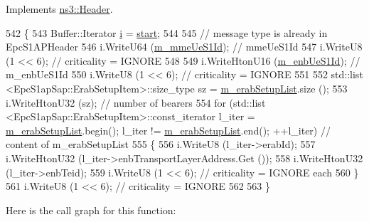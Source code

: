 Implements \hyperlink{classns3_1_1Header_afb61f1aac69ff8349a6bfe521fab5404}{ns3\+::\+Header}.


\begin{DoxyCode}
542 \{
543   Buffer::Iterator \hyperlink{bernuolliDistribution_8m_a6f6ccfcf58b31cb6412107d9d5281426}{i} = \hyperlink{namespacevisualizer_1_1core_a2a35e5d8a34af358b508dac8635754e0}{start};
544 
545   \textcolor{comment}{// message type is already in EpcS1APHeader}
546   i.WriteU64 (\hyperlink{classns3_1_1EpcS1APInitialContextSetupResponseHeader_abe6b8ad648a51caea3869046a89998be}{m\_mmeUeS1Id});         \textcolor{comment}{// mmeUeS1Id}
547   i.WriteU8 (1 << 6);               \textcolor{comment}{// criticality = IGNORE}
548 
549   i.WriteHtonU16 (\hyperlink{classns3_1_1EpcS1APInitialContextSetupResponseHeader_a25eeb666c4dcacb8233d935752d5d359}{m\_enbUeS1Id});     \textcolor{comment}{// m\_enbUeS1Id}
550   i.WriteU8 (1 << 6);               \textcolor{comment}{// criticality = IGNORE}
551 
552   std::list <EpcS1apSap::ErabSetupItem>::size\_type sz = \hyperlink{classns3_1_1EpcS1APInitialContextSetupResponseHeader_a92b6da6866cb4379178a9542e788d787}{m\_erabSetupList}.size (); 
553   i.WriteHtonU32 (sz);              \textcolor{comment}{// number of bearers}
554   \textcolor{keywordflow}{for} (std::list <EpcS1apSap::ErabSetupItem>::const\_iterator l\_iter = 
      \hyperlink{classns3_1_1EpcS1APInitialContextSetupResponseHeader_a92b6da6866cb4379178a9542e788d787}{m\_erabSetupList}.begin(); l\_iter != \hyperlink{classns3_1_1EpcS1APInitialContextSetupResponseHeader_a92b6da6866cb4379178a9542e788d787}{m\_erabSetupList}.end(); ++l\_iter) \textcolor{comment}{//
       content of m\_erabSetupList}
555   \{
556     i.WriteU8 (l\_iter->erabId);
557     i.WriteHtonU32 (l\_iter->enbTransportLayerAddress.Get ());
558     i.WriteHtonU32 (l\_iter->enbTeid);
559     i.WriteU8 (1 << 6);               \textcolor{comment}{// criticality = IGNORE each}
560   \}
561   i.WriteU8 (1 << 6);               \textcolor{comment}{// criticality = IGNORE}
562 
563 \}
\end{DoxyCode}


Here is the call graph for this function\+:


